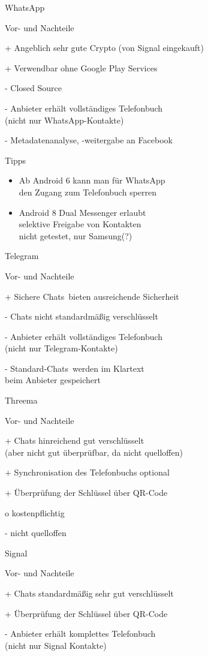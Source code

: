 
\begin{frame}{WhatsApp}
\begin{blex}{Vor- und Nachteile}
\item[+] Angeblich sehr gute Crypto (von Signal eingekauft)
\item[+] Verwendbar ohne Google Play Services
\item[-] Closed Source
\item[-] Anbieter erhält vollständiges Telefonbuch\\
  (nicht nur WhatsApp-Kontakte)
\item[-] Metadatenanalyse, -weitergabe an Facebook
\end{blex}
\begin{block}{Tipps}
  \begin{itemize}
    \item Ab Android 6 kann man für WhatsApp\\den Zugang zum Telefonbuch sperren
    \item Android 8 Dual Messenger erlaubt\\selektive Freigabe von Kontakten\\
      \scriptsize nicht getestet, nur Samsung(?) 
  \end{itemize}
\end{block}
\end{frame}

\begin{frame}{Telegram}
\begin{blex}{Vor- und Nachteile}
\item[+] \glqq Sichere Chats\grqq\ bieten ausreichende Sicherheit
\item[-] Chats nicht standardmäßig verschlüsselt
\item[-] Anbieter erhält vollständiges Telefonbuch\\ (nicht nur Telegram-Kontakte)
\item[-] \glqq Standard-Chats\grqq\ werden im Klartext\\beim Anbieter gespeichert
\end{blex}
\end{frame}

\begin{frame}{Threema}
\begin{blex}{Vor- und Nachteile}
\item[+] Chats hinreichend gut verschlüsselt\\(aber nicht gut überprüfbar, da nicht quelloffen)
\item[+] Synchronisation des Telefonbuchs optional
\item[+] Überprüfung der Schlüssel über QR-Code
\item[o] kostenpflichtig
\item[-] nicht quelloffen
\end{blex}
\end{frame}

\begin{frame}{Signal}
\begin{blex}{Vor- und Nachteile}
\item[+] Chats standardmäßig sehr gut verschlüsselt
\item[+] Überprüfung der Schlüssel über QR-Code
\item[-] Anbieter erhält komplettes Telefonbuch\\ (nicht nur Signal Kontakte)
\end{blex}
\end{frame}
